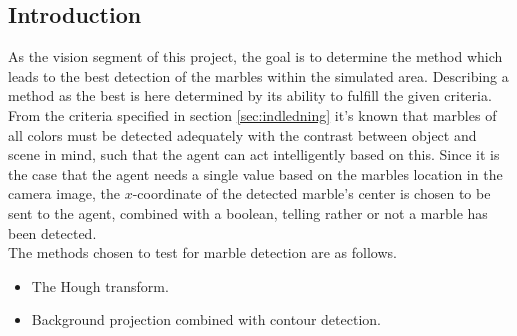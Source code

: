 \documentclass[../../../main.tex]{subfiles}
\begin{document}
\subsection{Introduction}
\label{sec:cv_introduction}

As the vision segment of this project, the goal is to determine the method which leads to
the best detection of the marbles within the simulated area. Describing a method as the best
is here determined by its ability to fulfill the given criteria.\\
From the criteria specified in section \ref{sec:indledning} it's known that marbles of all colors must be detected
adequately with the contrast between object and scene in mind, such that the agent can act intelligently based on this. Since it is the case that the agent needs a single
value based on the marbles location in the camera image, the $x$-coordinate of the detected marble's center is chosen to
be sent to the agent, combined with a boolean, telling rather or not a marble has been detected.\\ 
The methods chosen to test for marble detection are as follows.
\begin{itemize}
    \item The Hough transform.
    \item Background projection combined with contour detection.
\end{itemize}
\end{document}
